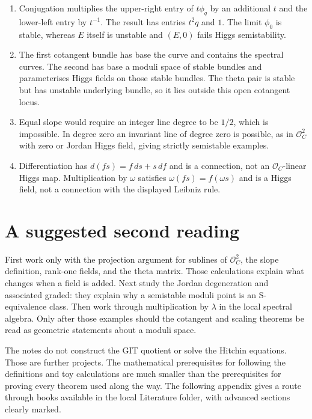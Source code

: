 \documentclass[11pt,a4paper]{article}
\numberwithin{equation}{section}
\theoremstyle{definition}
\newcommand{\OO}{\mathcal O}
\begin{document}
\begin{enumerate}[label=\textbf{\arabic*.},leftmargin=*]
is $10$, and the spectral genus is $4\cdot2-3=5$, so the
Jacobian dimension is $5$. The spectral line degree is
$1+2(2-1)=3$.
\item Conjugation multiplies the upper-right entry of $t\phi_q$
by an additional $t$ and the lower-left entry by $t^{-1}$.
The result has entries $t^2q$ and $1$. The limit $\phi_0$
is stable, whereas $E$ itself is unstable and $(E,0)$ fails
Higgs semistability.
\item The first cotangent bundle has base the curve and contains
the spectral curves. The second has base a moduli space of
stable bundles and parameterises Higgs fields on those stable
bundles. The theta pair is stable but has unstable underlying
bundle, so it lies outside this open cotangent locus.
\item Equal slope would require an integer line degree to be
$1/2$, which is impossible. In degree zero an invariant line
of degree zero is possible, as in $\OO_C^2$ with zero or
Jordan Higgs field, giving strictly semistable examples.
\item Differentiation has $d(fs)=f\,ds+s\,df$ and is a
connection, not an $\OO_C$-linear Higgs map. Multiplication
by $\omega$ satisfies $\omega(fs)=f(\omega s)$ and is a
Higgs field, not a connection with the displayed Leibniz rule.
\end{enumerate}

\section{A suggested second reading}
\label{sec:reading}

First work only with the projection argument for sublines of
$\OO_C^2$, the slope definition, rank-one fields, and the theta
matrix. Those calculations explain what changes when a field is
added. Next study the Jordan degeneration and associated graded:
they explain why a semistable moduli point is an S-equivalence class.
Then work through multiplication by $\lambda$ in the local spectral
algebra. Only after those examples should the cotangent and scaling
theorems be read as geometric statements about a moduli space.

The notes do not construct the GIT quotient or solve the Hitchin
equations. Those are further projects. The mathematical prerequisites
for following the definitions and toy calculations are much smaller
than the prerequisites for proving every theorem used along the way.
The following appendix gives a route through books available in the
local Literature folder, with advanced sections clearly marked.
\end{document}

